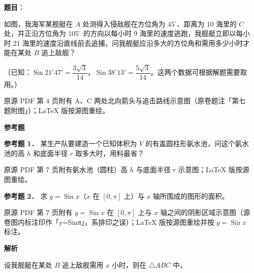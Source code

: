 \begin{answer}

\textbf{题目}：

如图，我海军某舰艇在 $A$ 处测得入侵敌舰在方位角为 $45^\circ$、距离为 10 海里的 $C$ 处，并正沿方位角为 $105^\circ$ 的方向以每小时 9 海里的速度逃跑，我舰艇立即以每小时 21 海里的速度沿直线前去追捕，问我舰艇应沿多大的方位角和需用多少小时才能在某处 $B$ 追上敌舰？

（已知：$\operatorname{Sin}21^\circ47'=\dfrac{3\sqrt3}{14}$，$\operatorname{Sin}38^\circ13'=\dfrac{5\sqrt3}{14}$。这两个数据可根据解题需要取用。）

\begin{gktip}
原源 PDF 第 4 页附有 A、C 两处北向箭头与追击路线示意图（原卷题注「第七题附图」）；LaTeX 版按源图重绘。
\end{gktip}
\nopagebreak[4]
\begin{center}\end{center}
\nopagebreak[4]
\begin{gktip}
\textbf{参考题}
\end{gktip}

\textbf{参考题 1．} 某生产队要建造一个已知体积为 $V$ 的有盖圆柱形氨水池，问这个氨水池的高 $h$ 和底面半径 $r$ 取多大时，用料最省？

\begin{gktip}
原源 PDF 第 7 页附有氨水池（圆柱）高 $h$ 与底面半径 $r$ 示意图；LaTeX 版按源图重绘。
\end{gktip}
\nopagebreak[4]
\begin{center}\end{center}
\nopagebreak[4]
\textbf{参考题 2．} 求 $y=\operatorname{Sin}x$（$x$ 在 $[0,\pi]$ 上）与 $x$ 轴所围成的图形的面积。
\nopagebreak[4]
\begin{center}\end{center}
\nopagebreak[4]
\begin{gktip}
原源 PDF 第 7 页附有 $y=\operatorname{Sin}x$ 在 $[0,\pi]$ 上与 $x$ 轴之间的阴影区域示意图（源卷图内标注印作「y=Sinπ」，系排印之误）；LaTeX 版按源图重绘并按 $y=\operatorname{Sin}x$ 标注。
\end{gktip}

\textbf{解析}
\nopagebreak[4]
\begin{center}\end{center}
\nopagebreak[4]
设我舰艇在某处 $B$ 追上敌舰需用 $x$ 小时，则在 $\triangle ABC$ 中，


\end{answer}

